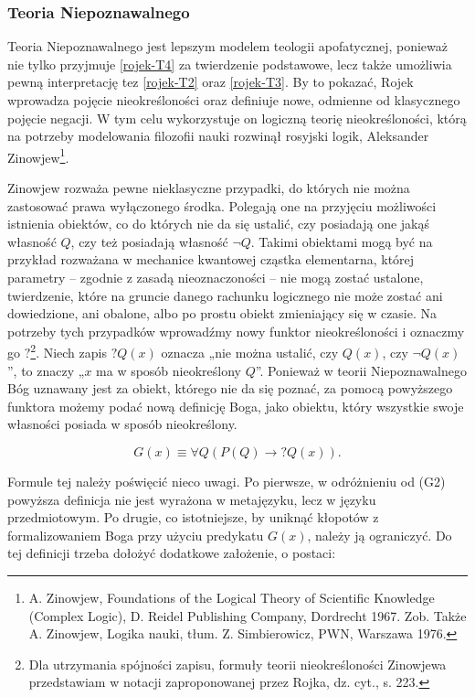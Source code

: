 \subsubsection{Teoria Niepoznawalnego}

Teoria Niepoznawalnego jest lepszym modelem teologii apofatycznej,
ponieważ nie tylko przyjmuje \eqref{rojek-T4} za twierdzenie podstawowe, lecz także
umożliwia pewną interpretację tez \eqref{rojek-T2} oraz \eqref{rojek-T3}. By to pokazać, Rojek
wprowadza pojęcie nieokreśloności oraz definiuje nowe, odmienne od
klasycznego pojęcie negacji. W tym celu wykorzystuje on logiczną teorię
nieokreśloności, którą na potrzeby modelowania filozofii nauki rozwinął
rosyjski logik, Aleksander Zinowjew\footnote{A. Zinowjew, Foundations
of the Logical Theory of Scientific Knowledge (Complex Logic), D.
Reidel Publishing Company, Dordrecht 1967. Zob. Także A. Zinowjew,
Logika nauki, tłum. Z. Simbierowicz, PWN, Warszawa 1976. }.

Zinowjew rozważa pewne nieklasyczne przypadki, do których nie można
zastosować prawa wyłączonego środka. Polegają one na przyjęciu
możliwości istnienia obiektów, co do których nie da się ustalić, czy
posiadają one jakąś własność $Q$, czy też posiadają własność
$\neg Q$. Takimi obiektami mogą być na przykład rozważana
w mechanice kwantowej cząstka elementarna, której parametry -- zgodnie z
zasadą nieoznaczoności -- nie mogą zostać ustalone, twierdzenie, które
na gruncie danego rachunku logicznego nie może zostać ani dowiedzione,
ani obalone, albo po prostu obiekt zmieniający się w czasie. Na
potrzeby tych przypadków wprowadźmy nowy funktor nieokreśloności i
oznaczmy go $?$\footnote{Dla utrzymania spójności zapisu, formuły teorii
nieokreśloności Zinowjewa przedstawiam w notacji zaproponowanej przez
Rojka, dz. cyt., s. 223.  }. Niech zapis $?Q(x)$ oznacza „nie można
ustalić, czy $Q(x)$, czy $\neg Q(x)$”, to znaczy „$x$ ma w sposób
nieokreślony $Q$”. Ponieważ w teorii Niepoznawalnego Bóg uznawany jest za
obiekt, którego nie da się poznać, za pomocą powyższego funktora możemy
podać nową definicję Boga, jako obiektu, który wszystkie swoje
własności posiada w sposób nieokreślony.

\begin{equation}\tag{G3}
   G(x) \equiv \forall Q (P(Q) \to ?Q(x)).
\end{equation}



Formule tej należy poświęcić nieco uwagi. Po pierwsze, w odróżnieniu od
(G2) powyższa definicja nie jest wyrażona w metajęzyku, lecz w języku
przedmiotowym. Po drugie, co istotniejsze, by uniknąć kłopotów z
formalizowaniem Boga przy użyciu predykatu $G(x)$, należy ją ograniczyć.
Do tej definicji trzeba dołożyć dodatkowe założenie, o postaci:

